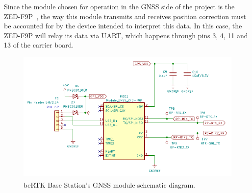 

Since the module chosen for operation in the GNSS side of the project is the ZED-F9P~\cite{ZED_F9P}, the way this module transmits and receives position correction must be accounted for by the device intended to interpret this data. In this case, the ZED-F9P will relay its data via \gls{UART}, which happens through pins 3, 4, 11 and 13 of the carrier board.

\begin{figure}[h]
	\centering
	\includegraphics[width=1.0\textwidth]{Chapters/Figures/chapter3/Modules_ZEDF9P.pdf}
	\caption{beRTK\textsuperscript{\textregistered} Base Station's GNSS module schematic diagram.}
	\label{fig:ZEDF9P_circuit}
\end{figure}

